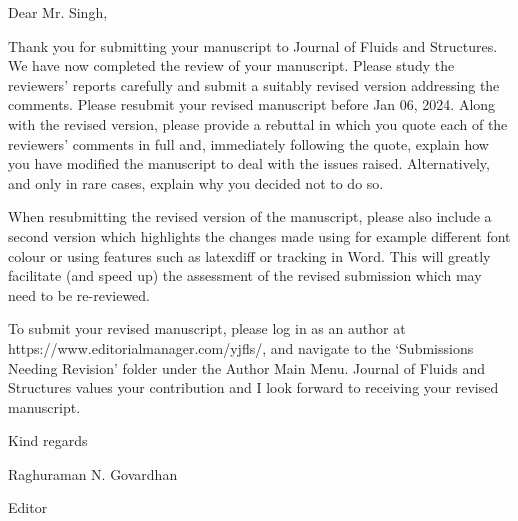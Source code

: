 \documentclass[onecolumn,a4paper,amsmath,amssym,pre]{revtex4}
\begin{document}
	{\color{red}
	Dear Mr. Singh,
	
	Thank you for submitting your manuscript to Journal of Fluids and Structures. We have now completed the review of your manuscript. Please study the reviewers' reports carefully and submit a suitably revised version addressing the comments. Please resubmit your revised manuscript before Jan 06, 2024. Along with the revised version, please provide a rebuttal in which you quote each of the reviewers' comments in full and, immediately following the quote, explain how you have modified the manuscript to deal with the issues raised. Alternatively, and only in rare cases, explain why you decided not to do so.
	
	When resubmitting the revised version of the manuscript, please also include a second version which highlights the changes made using for example different font colour or using features such as latexdiff or tracking in Word. This will greatly facilitate (and speed up) the assessment of the revised submission which may need to be re-reviewed.
	
	To submit your revised manuscript, please log in as an author at
	 https://www.editorialmanager.com/yjfls/, and navigate to the `Submissions Needing Revision' folder under the Author Main Menu.
	Journal of Fluids and Structures values your contribution and I look forward to receiving your revised manuscript.
	
	Kind regards
	
	Raghuraman N. Govardhan

	Editor\\
	
	  }
\end{document}
